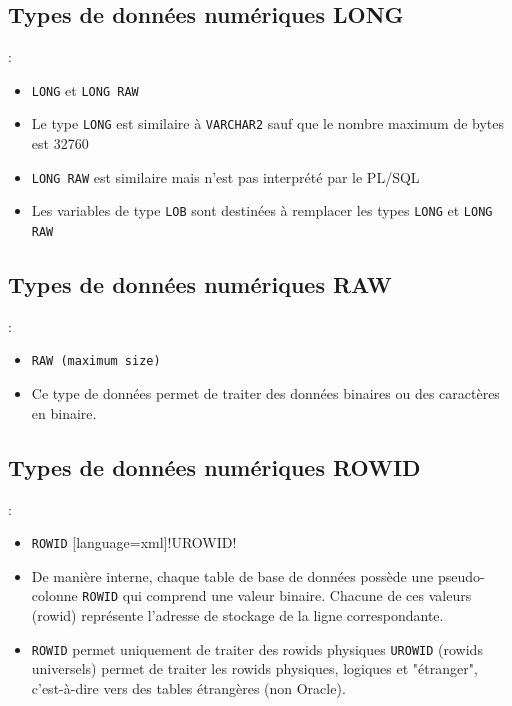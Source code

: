 \documentclass[10pt]{beamer}
\begin{document}
\subsection{Types de données numériques LONG}
\begin{frame}{\secname : \subsecname}
    \begin{itemize}
        \item \lstinline[language=xml]!LONG! et \lstinline[language=xml]!LONG RAW!
        \item Le type \lstinline[language=xml]!LONG! est similaire à \lstinline[language=xml]!VARCHAR2! sauf que le nombre maximum de bytes est 32760
        \item \lstinline[language=xml]!LONG RAW! est similaire mais n'est pas interprété par le PL/SQL
        \item Les variables de type \lstinline[language=xml]!LOB! sont destinées à remplacer les types \lstinline[language=xml]!LONG! et \lstinline[language=xml]!LONG RAW!
    \end{itemize}
\end{frame}

\subsection{Types de données numériques RAW}
\begin{frame}{\secname : \subsecname}
    \begin{itemize}
        \item \lstinline[language=xml]!RAW (maximum size)!
        \item Ce type de données permet de traiter des données binaires ou des caractères en binaire.
    \end{itemize}
\end{frame}

\subsection{Types de données numériques ROWID}
\begin{frame}{\secname : \subsecname}
    \begin{itemize}
        \item \lstinline[language=xml]!ROWID! [language=xml]!UROWID!
        \item De manière interne, chaque table de base de données possède une pseudo-colonne \lstinline[language=xml]!ROWID! qui comprend une valeur binaire.  Chacune de ces valeurs (rowid) représente l'adresse de stockage de la ligne correspondante.
        \item \lstinline[language=xml]!ROWID! permet uniquement de traiter des rowids physiques \lstinline[language=xml]!UROWID! (rowids universels) permet de traiter les rowids physiques, logiques et "étranger", c'est-à-dire vers des tables étrangères (non Oracle).
    \end{itemize}
    
\end{frame}
\end{document}
